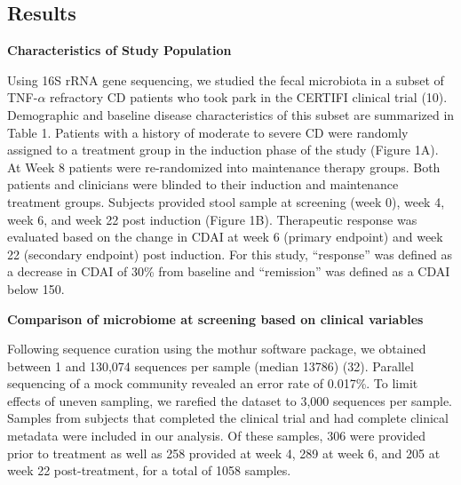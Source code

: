 \documentclass[11pt,]{article}
\begin{document}
\subsection{Results}\label{results}

\textbf{Characteristics of Study Population}

Using 16S rRNA gene sequencing, we studied the fecal microbiota in a
subset of TNF-\({\alpha}\) refractory CD patients who took park in the
CERTIFI clinical trial (10). Demographic and baseline disease
characteristics of this subset are summarized in Table 1. Patients with
a history of moderate to severe CD were randomly assigned to a treatment
group in the induction phase of the study (Figure 1A). At Week 8
patients were re-randomized into maintenance therapy groups. Both
patients and clinicians were blinded to their induction and maintenance
treatment groups. Subjects provided stool sample at screening (week 0),
week 4, week 6, and week 22 post induction (Figure 1B). Therapeutic
response was evaluated based on the change in CDAI at week 6 (primary
endpoint) and week 22 (secondary endpoint) post induction. For this
study, ``response'' was defined as a decrease in CDAI of 30\% from
baseline and ``remission'' was defined as a CDAI below 150.

\textbf{Comparison of microbiome at screening based on clinical
variables}

Following sequence curation using the mothur software package, we
obtained between 1 and 130,074 sequences per sample (median 13786) (32).
Parallel sequencing of a mock community revealed an error rate of
0.017\%. To limit effects of uneven sampling, we rarefied the dataset to
3,000 sequences per sample. Samples from subjects that completed the
clinical trial and had complete clinical metadata were included in our
analysis. Of these samples, 306 were provided prior to treatment as well
as 258 provided at week 4, 289 at week 6, and 205 at week 22
post-treatment, for a total of 1058 samples.
\end{document}
